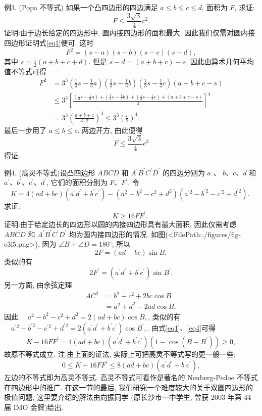 例3. (Popa 不等式) 如果一个凸四边形的四边满足 $a \leqslant b \leqslant c \leqslant d$, 面积为 $F$, 求证:
$$
F \leqslant \frac{3 \sqrt{3}}{4} c^2 . \label{eq1}
$$
证明:由于边长给定的四边形中, 圆内接四边形的面积最大, 因此我们仅需对圆内接四边形证明式\ref{eq1}便可.
这时
$$
F^2=(s-a)(s-b)(s-c)(s-d),
$$
其中 $s=\frac{1}{2}(a+b+c+d)$. 但是 $s-d=(a+b+c)-s$, 因此由算术几何平均值不等式可得
$$
\begin{aligned}
F^2 & =3^3\left(\frac{1}{3} s-\frac{1}{3} a\right)\left(\frac{1}{3} s-\frac{1}{3} b\right)\left(\frac{1}{3} s-\frac{1}{3} c\right)(a+b+c-s) \\
& \leqslant 3^3\left[\frac{\left(\frac{1}{3} s-\frac{1}{3} a\right)+\left(\frac{1}{3} s-\frac{1}{3} b\right)+\left(\frac{1}{3} s-\frac{1}{3} c\right)+(a+b+c-s)}{4}\right]^4 \\
& =3^3\left(\frac{a+b+c}{3 \cdot 2}\right)^4 \leqslant 3^3\left(\frac{c}{2}\right)^4 .
\end{aligned}
$$
最后一步用了 $a \leqslant b \leqslant c$.
两边开方, 由此便得
$$
F \leqslant \frac{3 \sqrt{3}}{4} c^2
$$
得证.



例4. (高灵不等式)设凸四边形 $A B C D$ 和 $A^{\prime} B^{\prime} C^{\prime} D^{\prime}$ 的四边分别为 $a$ 、 $b 、 c 、 d$ 和 $a^{\prime} 、 b^{\prime} 、 c^{\prime} 、 d^{\prime}$, 它们的面积分别为 $F 、 F^{\prime}$. 令
$$
K=4(a d+b c)\left(a^{\prime} d^{\prime}+b^{\prime} c^{\prime}\right)-\left(a^2-b^2-c^2+d^2\right)\left(a^{\prime 2}-b^{\prime 2}-c^{\prime 2}+d^{\prime 2}\right) \text {. }
$$
求证:
$$
K \geqslant 16 F F^{\prime} \text {. }
$$
证明:由于给定边长的四边形以圆的内接四边形具有最大面积, 因此仅需考虑 $A B C D$ 和 $A^{\prime} B^{\prime} C^{\prime} D^{\prime}$ 均为圆内接四边形的情况.
如图(<FilePath:./figures/fig-c3i5.png>), 因为 $\angle B+\angle D=180^{\circ}$, 所以
$$
2 F=(a d+b c) \sin B , \label{eq1}
$$
类似的有
$$
2 F^{\prime}=\left(a^{\prime} d^{\prime}+b^{\prime} c^{\prime}\right) \sin B^{\prime} . \label{eq2}
$$
另一方面, 由余弦定理
$$
\begin{aligned}
A C^2 & =b^2+c^2+2 b c \cos B \\
& =a^2+d^2-2 a d \cos B,
\end{aligned}
$$
因此 $\quad a^2-b^2-c^2+d^2=2(a d+b c) \cos B, \label{eq3}$,
类似的有 $\quad a^{\prime 2}-b^{\prime 2}-c^{\prime 2}+d^{\prime 2}=2\left(a^{\prime} d^{\prime}+b^{\prime} c^{\prime}\right) \cos B^{\prime}, \label{eq4}$.
由式\ref{eq1}、\ref{eq4}可得
$$
K-16 F F^{\prime}=4(a d+b c)\left(a^{\prime} d^{\prime}+b^{\prime} c^{\prime}\right)\left(1-\cos \left(B-B^{\prime}\right)\right) \geqslant 0,
$$
故原不等式成立.
注:由上面的证法, 实际上可把高灵不等式写的更一般一些:
$$
0 \leqslant K-16 F F^{\prime} \leqslant 8(a d+b c)\left(a^{\prime} d^{\prime}+b^{\prime} c^{\prime}\right),
$$
左边的不等式即为高灵不等式.
高灵不等式可看作是著名的 Neuberg-Pedoe 不等式在四边形中的推广.
在这一节的最后, 我们研究一个难度较大的关于双圆四边形的极值问题, 这里要介绍的解法由向振同学 (原长沙市一中学生, 曾获 2003 年第 44 届 $\mathrm{IMO}$ 金牌)给出.



